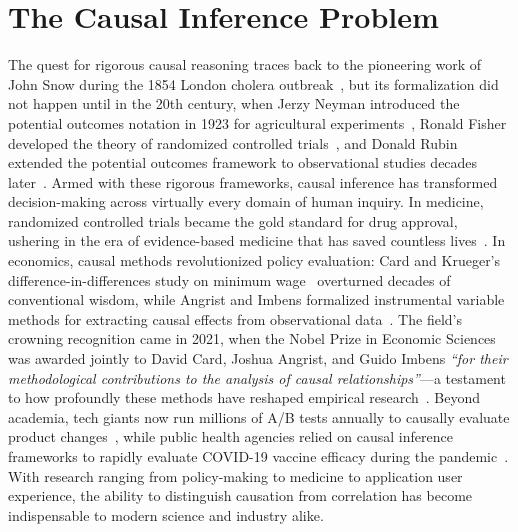 \section{The Causal Inference Problem}

The quest for rigorous causal reasoning traces back to the pioneering work of John Snow during the 1854 London cholera outbreak~\cite{snow1855mode}, but its formalization did not happen until in the 20th century, when Jerzy Neyman introduced the potential outcomes notation in 1923 for agricultural experiments~\cite{neyman1923application}, Ronald Fisher developed the theory of randomized controlled trials~\cite{fisher1971design}, and Donald Rubin extended the potential outcomes framework to observational studies decades later~\cite{rubin1974estimating}.
Armed with these rigorous frameworks, causal inference has transformed decision-making across virtually every domain of human inquiry.
In medicine, randomized controlled trials became the gold standard for drug approval, ushering in the era of evidence-based medicine that has saved countless lives~\cite{sackett1996evidence}.
In economics, causal methods revolutionized policy evaluation: Card and Krueger's difference-in-differences study on minimum wage~\cite{card1993minimum} overturned decades of conventional wisdom, while Angrist and Imbens formalized instrumental variable methods for extracting causal effects from observational data~\cite{angrist1996identification}.
The field's crowning recognition came in 2021, when the Nobel Prize in Economic Sciences was awarded jointly to David Card, Joshua Angrist, and Guido Imbens \emph{``for their methodological contributions to the analysis of causal relationships''}---a testament to how profoundly these methods have reshaped empirical research~\cite{nobel2021economics}.
Beyond academia, tech giants now run millions of A/B tests annually to causally evaluate product changes~\cite{kohavi2020trustworthy}, while public health agencies relied on causal inference frameworks to rapidly evaluate COVID-19 vaccine efficacy during the pandemic~\cite{polack2020safety}.
With research ranging from policy-making to medicine to application user experience, the ability to distinguish causation from correlation has become indispensable to modern science and industry alike.

